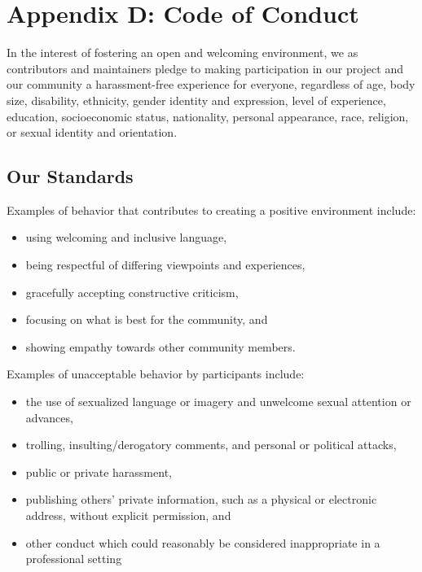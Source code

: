 \documentclass{scrbook}
\begin{document}
\chapter{Appendix D: Code of Conduct}\label{conduct}


In the interest of fostering an open and welcoming environment, we as
contributors and maintainers pledge to making participation in our project and
our community a harassment-free experience for everyone, regardless of age, body
size, disability, ethnicity, gender identity and expression, level of
experience, education, socioeconomic status, nationality, personal appearance,
race, religion, or sexual identity and orientation.

\section*{Our Standards}


Examples of behavior that contributes to creating a positive environment
include:

\begin{itemize}

\item using welcoming and inclusive language,

\item being respectful of differing viewpoints and experiences,

\item gracefully accepting constructive criticism,

\item focusing on what is best for the community, and

\item showing empathy towards other community members.

\end{itemize}


Examples of unacceptable behavior by participants include:

\begin{itemize}

\item the use of sexualized language or imagery and unwelcome sexual
  attention or advances,

\item trolling, insulting/derogatory comments, and personal or political
  attacks,

\item public or private harassment,

\item publishing others' private information, such as a physical or
  electronic address, without explicit permission, and

\item other conduct which could reasonably be considered inappropriate in
  a professional setting

\end{itemize}
\end{document}
